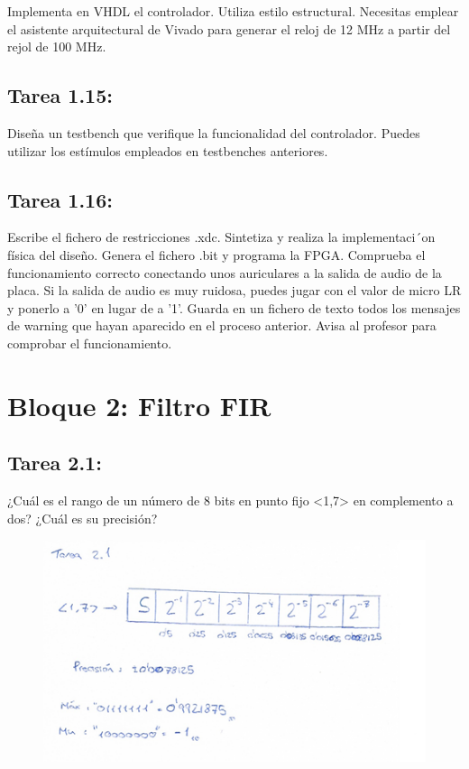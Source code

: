 \documentclass{article}
\begin{document}
Implementa en VHDL el controlador. Utiliza estilo estructural. Necesitas emplear el asistente arquitectural de Vivado para generar el reloj de 12 MHz a partir del rejol de 100 MHz.

\subsection{Tarea 1.15:}

Diseña un testbench que verifique la funcionalidad del controlador. Puedes utilizar los estímulos empleados en testbenches anteriores.

\subsection{Tarea 1.16:}

Escribe el fichero de restricciones .xdc. Sintetiza y realiza la implementaci´on física del diseño. Genera el fichero .bit y programa la FPGA. Comprueba el funcionamiento correcto conectando unos auriculares a la salida de audio de la placa. Si la salida de audio es muy ruidosa, puedes jugar con el valor de micro LR y ponerlo a ’0’ en lugar de a '1'.
Guarda en un fichero de texto todos los mensajes de warning que hayan aparecido en el proceso anterior.
Avisa al profesor para comprobar el funcionamiento.

\section{Bloque 2: Filtro FIR}

\subsection{Tarea 2.1:}
¿Cuál es el rango de un número de 8 bits en punto fijo <1,7> en complemento a dos?
¿Cuál es su precisión?
\begin{figure}[H]
\centering
\includegraphics[width=1\linewidth]{images/2_1.png}
\end{figure}
\end{document}
